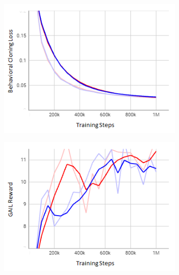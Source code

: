 \documentclass[letterpaper, 10 pt, conference]{ieeeconf}  %
\begin{document}
\begin{figure}[t]
     \centering
     \begin{subfigure}[b]{0.16\linewidth}
         \centering
         \includegraphics[width=\linewidth]{Fig9a.png}
         \caption{}
         \label{fig9a}
     \end{subfigure}
     \hfill
     \begin{subfigure}[b]{0.16\linewidth}
         \centering
         \includegraphics[width=\linewidth]{Fig9b.png}
         \caption{}
         \label{fig9b}
     \end{subfigure}
     \hfill
     \begin{subfigure}[b]{0.16\linewidth}
         \centering

\end{subfigure}
\end{figure}
\end{document}
